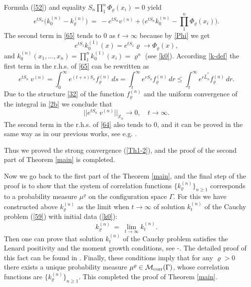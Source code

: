 \documentclass[a4paper,12pt]{article}
\newcommand{\XX}{{\mathbb X}}
\begin{document}
Formula (\ref{52}) and equality $S_n \prod\limits_{1}^{n} \Phi_\varrho(x_i) = 0$ yield
\begin{equation}\label{65}
e^{t S_n} \big( k_{0}^{(n)} - k_\varrho^{(n)} \big) \ = \ - e^{t S_n} v^{(n)} + \Big( e^{t S_n} k_{0}^{(n)} - \prod\limits_{1}^{n} \Phi_\varrho(x_i) \Big).
\end{equation}
The second term in \eqref{65} tends to 0 as $t \to \infty$ because by \eqref{Phi} we get
$$
e^{t S_1} k_{0}^{(1)}(x) = e^{t S_1} \varrho  \to \Phi_\varrho(x),
$$
and $ k_{0}^{(n)} (x_1, \ldots, x_n) = \prod\limits_{1}^{n} k_{0}^{(1)}(x_i) = \varrho^n$ (see \eqref{k0}).
According \eqref{k-def} the first term in the r.h.s. of  \eqref{65} can be rewritten as
\begin{equation*}\label{1termA}
e^{t S_n} \ v^{(n)} = \int_{0}^{\infty}e^{(t+s) S_n}f_\varrho^{(n)} \, ds =  \int_{t}^{\infty}e^{r S_n} f_\varrho^{(n)} \, dr  \le  \int_{t}^{\infty} e^{r  \hat L_n^{\ast}} f_\varrho^{(n)} \, dr .
\end{equation*}
Due to the structure \eqref{32} of the function $f_\varrho^{(n)}$ and the uniform convergence of the integral in \eqref{2b} we conclude that
\begin{equation}\label{1term}
||e^{t S_n} \ v^{(n)}||_{{\XX}_n}\to 0,\quad t\to\infty.
\end{equation}
The second term in the r.h.s. of   \eqref{64} also tends to 0, and it can be proved in the same way as in our previous works, see e.g. \cite{KPZh}.

Thus we proved the strong convergence (\ref{Th1-2}), and the proof of the second part of Theorem \ref{main} is completed.
\medskip

Now we go back to the first part of the Theorem \ref{main}, and the final step of the proof is to show that the system of correlation functions $\{k_\varrho^{(n)} \}_{n \ge 1}$ corresponds to a probability measure $\mu^\varrho$ on the configuration space $\Gamma$. For this  we have constructed above $k_\varrho^{(n)}$ as the limit when $t \to \infty$ of solution $ k_{t}^{(n)} $
of the Cauchy problem (\ref{59}) with initial data (\ref{k0}):
\begin{equation}\label{limk}
k^{(n)}_\varrho \ = \ \lim_{t\to\infty} k_{t}^{(n)}.
\end{equation}
Then one can prove that solution $ k_{t}^{(n)}$
of the Cauchy problem satisfies the Lenard positivity and the moment growth conditions, see \cite{L1}-\cite{L2}.
The detailed proof of this fact can be found in \cite{KKPZ}.
Finally, these conditions imply that for any  $\varrho >0$  there exists a unique probability measure $\mu^\varrho \in {\cal M}_{\rm{corr}}(\Gamma)$, whose correlation functions are $\{ k^{(n)}_\varrho\}_{n \ge 1}$.
This completed the proof of Theorem \ref{main}.
\end{document}
